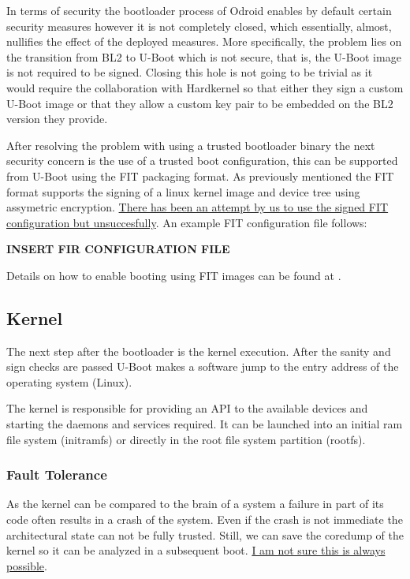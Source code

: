 In terms of security the bootloader process of Odroid enables by default certain security measures however it is not completely closed, which essentially, almost, nullifies the effect of the deployed measures. More specifically, the problem lies on the transition from BL2 to U-Boot which is not secure, that is, the U-Boot image is not required to be signed. Closing this hole is not going to be trivial as it would require the collaboration with Hardkernel so that either they sign a custom U-Boot image or that they allow a custom key pair to be embedded on the BL2 version they provide.

After resolving the problem with using a trusted bootloader binary the next security concern is the use of a trusted boot configuration, this can be supported from U-Boot using the FIT packaging format. As previously mentioned the FIT format supports the signing of a linux kernel image and device tree using assymetric encryption. \underline{There has been an attempt by us to use the signed FIT configuration but unsuccesfully}. An example FIT configuration file follows:

\textbf{INSERT FIR CONFIGURATION FILE}

Details on how to enable booting using FIT images can be found at \cite{uImage-fit}.

\subsection{Kernel}

The next step after the bootloader is the kernel execution. After the sanity and sign checks are passed U-Boot makes a software jump to the entry address of the operating system (Linux).

The kernel is responsible for providing an API to the available devices and starting the daemons and services required. It can be launched into an initial ram file system (initramfs) or directly in the root file system partition (rootfs).

\subsubsection{Fault Tolerance}

As the kernel can be compared to the brain of a system a failure in part of its code often results in a crash of the system. Even if the crash is not immediate the architectural state can not be fully trusted. Still, we can save the coredump of the kernel so it can be analyzed in a subsequent boot. \underline{I am not sure this is always possible}.

